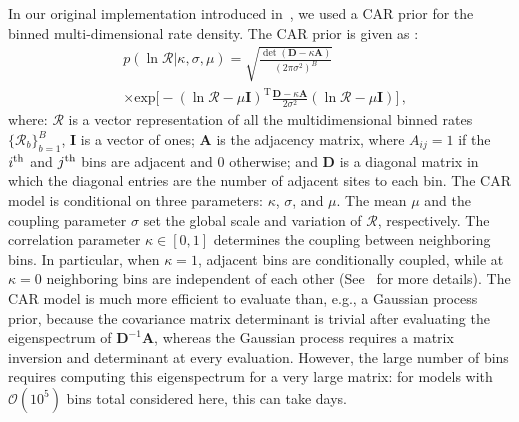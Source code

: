 \begin{refsection}
\begin{subappendices}
In our original implementation introduced in~\citet{Heinzel:2024jlc}, we used a \ac{CAR} prior for the binned multi-dimensional rate density. The \ac{CAR} prior is given as \citep{Besag:1974abc, Besag:1995car}:
\begin{align}
& p ( \ln\boldsymbol{\mathcal{R}} | \kappa , \sigma , \mu )
=
\sqrt{
\frac
{ \det ( \mathbf{D} - \kappa \mathbf{A} ) }
{ (2\pi \sigma^2 )^B }
}
\nonumber \\
& \times
\mathrm{exp}
\bigg[
- ( \ln\boldsymbol{\mathcal{R}} - \mu \mathbf{I} )^\mathrm{T}
\frac { \mathbf{D} - \kappa \mathbf{A} } { 2 \sigma^2 }
( \ln\boldsymbol{\mathcal{R}} - \mu \mathbf{I} )
\bigg]
\, ,
\label{eq: car prior}
\end{align}
where: $\boldsymbol{\mathcal{R}}$ is a vector representation of all the multidimensional binned rates $\{\mathcal{R}_b\}_{b=1}^B$, $\mathbf{I}$ is a vector of ones; $\mathbf{A}$ is the adjacency matrix, where $A_{ij} = 1$ if the $i^{\rm th}$ and $j^{\rm th}$ bins are adjacent and 0 otherwise; and $\mathbf{D}$ is a diagonal matrix in which the diagonal entries are the number of adjacent sites to each bin.
The \ac{CAR} model is conditional on three parameters: $\kappa$, $\sigma$, and $\mu$. The mean $\mu$ and the coupling parameter $\sigma$ set the global scale and variation of $\boldsymbol{\mathcal{R}}$, respectively. The correlation parameter $\kappa \in [0,1]$ determines the coupling between neighboring bins. In particular, when $\kappa=1$, adjacent bins are conditionally coupled, while at $\kappa=0$ neighboring bins are independent of each other (See~\citet{Heinzel:2024jlc} for more details). The CAR model is much more efficient to evaluate than, e.g., a Gaussian process prior, because the covariance matrix determinant is trivial after evaluating the eigenspectrum of $\mathbf{D}^{-1}\mathbf{A}$, whereas the Gaussian process requires a matrix inversion and determinant at every evaluation. However, the large number of bins requires computing this eigenspectrum for a very large matrix: for models with $\mathcal{O}(10^5)$ bins total considered here, this can take days.


\end{subappendices}
\end{refsection}
